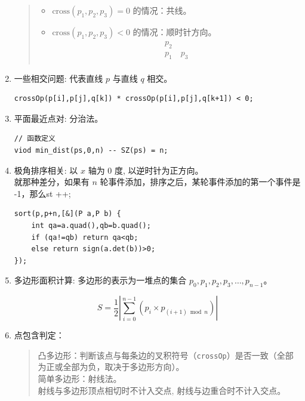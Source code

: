 \documentclass[a4paper,12pt]{article}
\begin{document}
\begin{enumerate}
\begin{quote}
\begin{itemize}
        \item \( \text{cross}(p_1, p_2, p_3) = 0 \) 的情况：共线。
        
        \item \( \text{cross}(p_1, p_2, p_3) < 0 \) 的情况：顺时针方向。
        \[
        \begin{array}{c}
        p_2 \\
        p_1 \quad p_3 \\
        \end{array}
        \]
    \end{itemize}
    \end{quote}
    \item 一些相交问题:
    代表直线 \(p\) 与直线 \(q\) 相交。
\begin{lstlisting}
crossOp(p[i],p[j],q[k]) * crossOp(p[i],p[j],q[k+1]) < 0;  
\end{lstlisting}
    \item 平面最近点对:
    分治法。
\begin{lstlisting}
// 函数定义
viod min_dist(ps,0,n) -- SZ(ps) = n;
\end{lstlisting}
    \item 极角排序相关:
    以 \(x\) 轴为 0 度, 以逆时针为正方向。\\

    就那种差分，如果有 \(n\) 轮事件添加，排序之后，某轮事件添加的第一个事件是 -1，那么st ++; 
\begin{lstlisting}
sort(p,p+n,[&](P a,P b) {
    int qa=a.quad(),qb=b.quad();
    if (qa!=qb) return qa<qb;
    else return sign(a.det(b))>0;
});
\end{lstlisting}
    \item 多边形面积计算:
    多边形的表示为一堆点的集合 \( p_0, p_1, p_2, p_3, \ldots, p_{n-1} \)。

    \[ S = \frac{1}{2} \left| \sum_{i=0}^{n-1} (p_i \times p_{(i+1) \bmod n}) \right| \]
    
    \item 点包含判定：
    \begin{quote}
        凸多边形：判断该点与每条边的叉积符号（\texttt{crossOp}）是否一致（全部为正或全部为负，取决于多边形方向）。
        \\     

        简单多边形：射线法。
        \\

        射线与多边形顶点相切时不计入交点, 射线与边重合时不计入交点。 
    \end{quote}


\end{enumerate}
\end{document}
